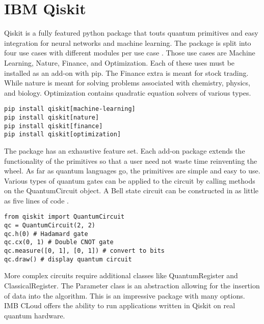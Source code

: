 \documentclass[conference]{IEEEtran}
\begin{document}
\section{IBM Qiskit}
Qiskit is a fully featured python package that touts quantum primitives and easy integration for neural networks and machine learning. 
The package is split into four use cases with different modules per use case \cite{b7}. 
Those use cases are Machine Learning, Nature, Finance, and Optimization. 
Each of these uses must be installed as an add-on with pip. 
The Finance extra is meant for stock trading. 
While nature is meant for solving problems associated with chemistry, physics, and biology. 
Optimization contains quadratic equation solvers of various types. 

\begin{verbatim}
pip install qiskit[machine-learning]
pip install qiskit[nature]
pip install qiskit[finance]
pip install qiskit[optimization]
\end{verbatim}

The package has an exhaustive feature set. 
Each add-on package extends the functionality of the primitives so that a user need not waste time reinventing the wheel. 
As far as quantum languages go, the primitives are simple and easy to use. 
Various types of quantum gates can be applied to the circuit by calling methods on the QuantumCircuit object. 
A Bell state circuit can be constructed in as little as five lines of code \cite{b7}. 

\begin{verbatim}
from qiskit import QuantumCircuit
qc = QuantumCircuit(2, 2)
qc.h(0) # Hadamard gate
qc.cx(0, 1) # Double CNOT gate
qc.measure([0, 1], [0, 1]) # convert to bits
qc.draw() # display quantum circuit
\end{verbatim}

More complex circuits require additional classes like QuantumRegister and ClassicalRegister. 
The Parameter class is an abstraction allowing for the insertion of data into the algorithm. 
This is an impressive package with many options. 
IMB CLoud offers the ability to run applications written in Qiskit on real quantum hardware.
\end{document}
